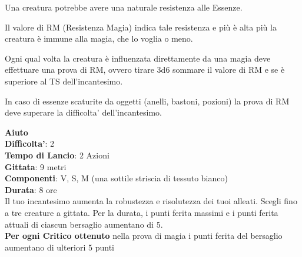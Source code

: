 \begin{multicols}{2}
Una creatura potrebbe avere una naturale resistenza alle Essenze.

Il valore di RM (Resistenza Magia) indica tale resistenza e più è alta più la creatura è immune alla magia, che lo voglia o meno.

Ogni qual volta la creatura è influenzata direttamente da una magia deve effettuare una prova di RM, ovvero tirare 3d6 sommare il valore di RM e se è superiore al TS dell'incantesimo.

In caso di essenze scaturite da oggetti (anelli, bastoni, pozioni) la prova di RM deve superare la difficolta' dell'incantesimo.

\pagebreak




\textbf{Aiuto}\\
\textbf{Difficolta'}: 2\\
\textbf{Tempo di Lancio}: 2 Azioni\\
\textbf{Gittata}: 9 metri\\
\textbf{Componenti}: V, S, M (una sottile striscia di tessuto bianco)\\
\textbf{Durata}: 8 ore\\
Il tuo incantesimo aumenta la robustezza e risolutezza dei tuoi alleati. Scegli fino a tre creature a gittata. Per la durata, i punti ferita massimi e i punti ferita attuali di ciascun bersaglio aumentano di 5.\\
\textbf{Per ogni Critico ottenuto} nella prova di magia i punti ferita del bersaglio aumentano di ulteriori 5 punti


\end{multicols}
